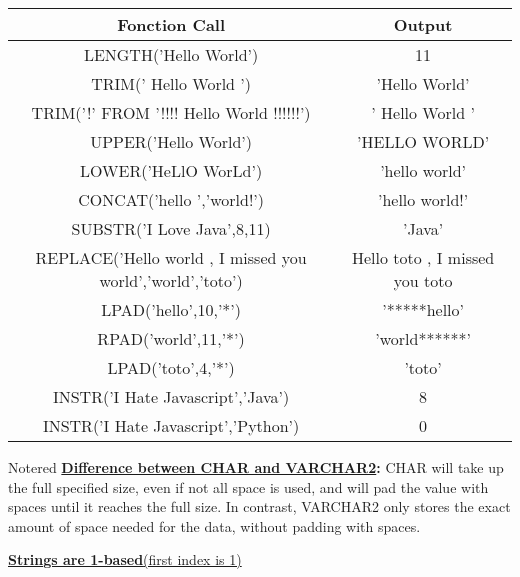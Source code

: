 \begin{center}
    
\renewcommand{\arraystretch}{1.5}
    \begin{tabular}{|c|c|}
        \hline
        Fonction Call & Output\\
        \hline
        LENGTH('Hello World') & 11 \\
        \hline
        TRIM('   Hello  World   ') & 'Hello  World'\\
        \hline
        TRIM('!' FROM '!!!! Hello  World  !!!!!!') & ' Hello  World  ' \\
        \hline
        UPPER('Hello World') &  'HELLO WORLD'\\
        \hline
        LOWER('HeLlO WorLd') & 'hello world'\\
        \hline
        CONCAT('hello ','world!') & 'hello world!'\\
        \hline
        SUBSTR('I Love Java',8,11) & 'Java'\\
        \hline
        REPLACE('Hello world , I missed you world','world','toto') & Hello toto , I missed you toto\\
        \hline
        LPAD('hello',10,'*') & '*****hello'\\
        \hline
        RPAD('world',11,'*') & 'world******' \\
        \hline
        LPAD('toto',4,'*') & 'toto'\\
        \hline
        INSTR('I Hate Javascript','Java') & 8\\
        \hline
        INSTR('I Hate Javascript','Python') & 0\\
        \hline 
   \end{tabular}

\end{center}

\begin{prettyBox}{Note}{red}
  \textbf{\underline{Difference between CHAR and VARCHAR2}:} CHAR will take up the full specified size, even if not all space is used, and will pad the value with spaces until it reaches the full size. 
In contrast, VARCHAR2 only stores the exact amount of space needed for the data, without padding with spaces.

\vspace{0.25cm}
\underline{\textbf{Strings are 1-based}(first index is 1)}
\end{prettyBox}

